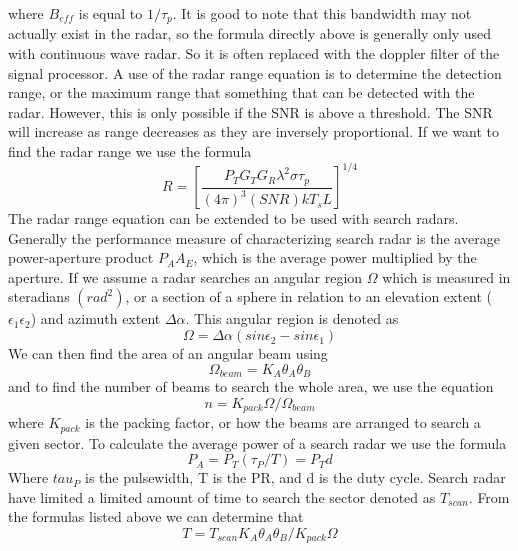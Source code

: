 \documentclass[12pt]{article}
\begin{document}
where $B_{eff}$ is equal to $1 / \tau_p$. It is good to note that this bandwidth may not actually exist in the radar, so the formula directly above is generally only used with continuous wave radar. So it is often replaced with the doppler filter of the signal processor.
A use of the radar range equation is to determine the detection range, or the maximum range that something that can be detected with the radar. However, this is only possible if the SNR is above a threshold. The SNR will increase as range decreases as they are inversely proportional. If we want to find the radar range we use the formula 
\begin{equation}
    R = \left[ \frac{P_T G_T G_R \lambda^2 \sigma \tau_p}{(4 \pi)^3 (SNR) k T_s L} \right]^{1/4}
\end{equation}
The radar range equation can be extended to be used with search radars. Generally the performance measure of characterizing search radar is the average power-aperture product $P_A A_E$, which is the average power multiplied by the aperture. If we assume a radar searches an angular region $\Omega$ which is measured in steradians $({rad}^2)$, or a section of a sphere in relation to an elevation extent ($\epsilon_1 \epsilon_2$) and azimuth extent $\Delta \alpha$. This angular region is denoted as 
\begin{equation}
    \Omega = \Delta \alpha(sin \epsilon_2 - sin \epsilon_1)
\end{equation}
We can then find the area of an angular beam using 
\begin{equation}
    \Omega_{beam} = K_A \theta_A \theta_B
\end{equation}
and to find the number of beams to search the whole area, we use the equation
\begin{equation}
    n = K_{pack}\Omega / \Omega_{beam}
\end{equation}
where $K_{pack}$ is the packing factor, or how the beams are arranged to search a given sector. To calculate the average power of a search radar we use the formula
\begin{equation}
    P_A = P_T (\tau_P / T) = P_T d
\end{equation}
Where $tau_P$ is the pulsewidth, T is the PR, and d is the duty cycle. Search radar have limited a limited amount of time to search the sector denoted as $T_{scan}$. From the formulas listed above we can determine that 
\begin{equation}
    T = T_{scan} K_A \theta_A \theta_B / K_{pack} \Omega 
\end{equation}
\end{document}
